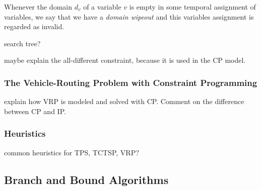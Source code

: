 \documentclass{mprop}
\theoremstyle{definition}
\begin{document}
Whenever the domain $d_{v}$ of a variable $v$ is empty in some temporal assignment of variables, we say that we have a \textit{domain wipeout} and this variables assignment is regarded as invalid.

search tree?

maybe explain the all-different constraint, because it is used in the CP model.

\subsubsection{The Vehicle-Routing Problem with Constraint Programming}
explain how VRP is modeled and solved with CP. Comment on the difference between CP and IP.

\subsubsection{Heuristics}
common heuristics for TPS, TCTSP, VRP?

\subsection{Branch and Bound Algorithms}
\label{branchandbound}


\end{document}
